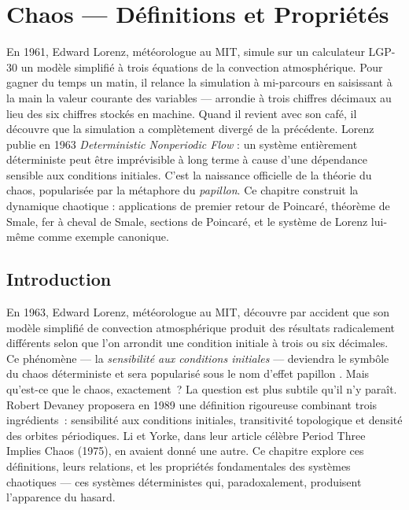\chapter{Chaos --- D\'efinitions et Propri\'et\'es}
\label{ch:chaos}

En 1961, Edward Lorenz, météorologue au MIT, simule sur un calculateur LGP-30 un modèle simplifié à trois équations de la convection atmosphérique. Pour gagner du temps un matin, il relance la simulation à mi-parcours en saisissant à la main la valeur courante des variables --- arrondie à trois chiffres décimaux au lieu des six chiffres stockés en machine. Quand il revient avec son café, il découvre que la simulation a complètement divergé de la précédente. Lorenz publie en 1963 \emph{Deterministic Nonperiodic Flow} : un système entièrement déterministe peut être imprévisible à long terme à cause d'une dépendance sensible aux conditions initiales. C'est la naissance officielle de la théorie du chaos, popularisée par la métaphore du \emph{papillon}. Ce chapitre construit la dynamique chaotique : applications de premier retour de Poincaré, théorème de Smale, fer à cheval de Smale, sections de Poincaré, et le système de Lorenz lui-même comme exemple canonique.

\section{Introduction}

En 1963, Edward Lorenz, m\'et\'eorologue au MIT, d\'ecouvre par accident que son mod\`ele simplifi\'e de convection atmosph\'erique produit des r\'esultats radicalement diff\'erents selon que l'on arrondit une condition initiale \`a trois ou six d\'ecimales. Ce ph\'enom\`ene --- la \emph{sensibilit\'e aux conditions initiales} --- deviendra le symb\^ole du chaos d\'eterministe et sera popularis\'e sous le nom d'\og effet papillon \fg. Mais qu'est-ce que le chaos, exactement~? La question est plus subtile qu'il n'y para\^it. Robert Devaney proposera en 1989 une d\'efinition rigoureuse combinant trois ingr\'edients~: sensibilit\'e aux conditions initiales, transitivit\'e topologique et densit\'e des orbites p\'eriodiques. Li et Yorke, dans leur article c\'el\`ebre \og Period Three Implies Chaos \fg{} (1975), en avaient donn\'e une autre. Ce chapitre explore ces d\'efinitions, leurs relations, et les propri\'et\'es fondamentales des syst\`emes chaotiques --- ces syst\`emes d\'eterministes qui, paradoxalement, produisent l'apparence du hasard.

